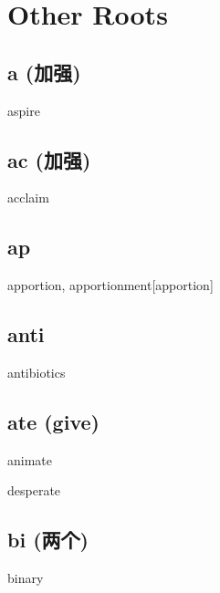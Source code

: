 \chapter{Other Roots}

\section{a (加强)}

\begin{RefWord}{aspire}
\end{RefWord}

\section{ac (加强)}

\begin{RefWord}{acclaim}
\end{RefWord}

\section{ap}

\begin{RefWord}{apportion, apportionment}[apportion]
\end{RefWord}

\section{anti}

\begin{RefWord}{antibiotics}
\end{RefWord}

\section{ate (give)}

\begin{RefWord}{animate}
\end{RefWord}

\begin{DefWord}{desperate}
\end{DefWord}

\section{bi (两个)}

\begin{RefWord}{binary}
\end{RefWord}

